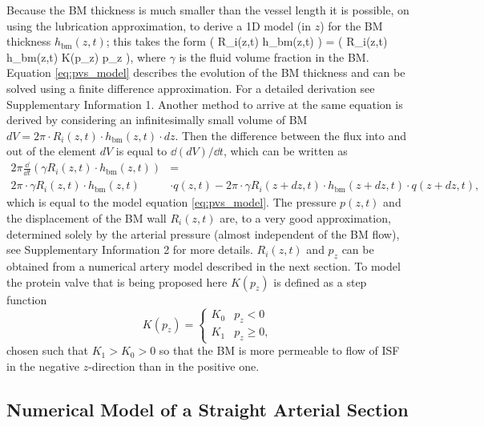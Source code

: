 \documentclass[a4paper,titlepage]{scrartcl}
\begin{document}
Because the BM thickness is much smaller than the vessel length it is possible, on using the lubrication approximation, to derive a 1D model (in $z$) for the BM thickness $h_\textrm{bm}(z,t)$; this takes the form
\beq
{} \left( \gamma R_i(z,t) \cdot h_\textrm{bm}(z,t) \right) =  \left( R_i(z,t) \cdot h_\textrm{bm}(z,t) \cdot K(p_{z}) \cdot p_{z} \right),\label{eq:pvs_model}
\eeq
where $\gamma$ is the fluid volume fraction in the BM. Equation \eqref{eq:pvs_model} describes the evolution of the BM thickness and can be solved using a finite difference approximation. For a detailed derivation see Supplementary Information 1. Another method to arrive at the same equation is derived by considering an infinitesimally small volume of BM $dV = 2\pi \cdot R_i(z,t) \cdot h_\textrm{bm}(z,t) \cdot dz$. Then the difference between the flux into and out of the element $dV$ is equal to $\dd (dV)/ \dd t$, which can be written as
\begin{align}
2\pi \frac{\dd}{\dd t} \left( \gamma R_i(z,t) \cdot h_\textrm{bm}(z,t) \right) &= \nonumber \\ 
2\pi \cdot \gamma R_i(z,t) \cdot h_\textrm{bm}(z,t) & \cdot q(z,t) - 2\pi \cdot \gamma R_i(z + dz,t) \cdot h_\textrm{bm}(z + dz,t) \cdot q(z + dz,t),
\end{align}
which is equal to the model equation \eqref{eq:pvs_model}. The pressure $p(z,t)$ and the displacement of the BM wall $R_i(z,t)$ are, to a very good approximation, determined solely by the arterial pressure (\ie almost independent of the BM flow), see Supplementary Information 2 for more details. $R_i(z,t)$ and $p_z$ can be obtained from a numerical artery model described in the next section. To model the protein valve that is being proposed here $K(p_z)$ is defined as a step function
\begin{equation}
  K(p_z) = \begin{cases}
    K_0 & p_z < 0\\
    K_1 & p_z \geq 0,
  \end{cases}
\end{equation}
chosen such that $K_1 > K_0 > 0$ so that the BM is more permeable to flow of ISF in the negative $z$-direction than in the positive one.


\subsection{Numerical Model of a Straight Arterial Section}
\end{document}
